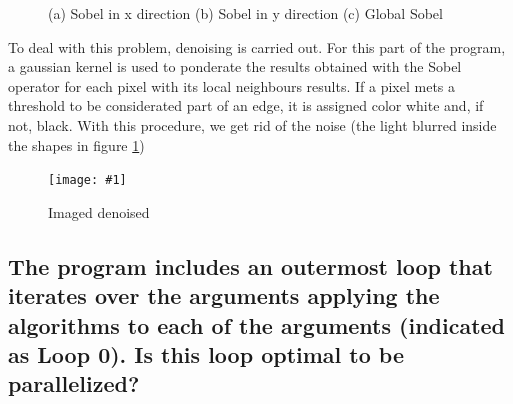 \documentclass{article}
\newcommand{\myFigure}[4]{%
    \begin{figure}[!ht]
        \texttt{[image: \#1]}
        \centering
        \caption{#2}
        \label{#3}
    \end{figure}
}
\newcommand{\question}[1]{\subsection{#1}}
\begin{document}
\begin{figure}[h!]
    \centering
    \caption{(a) Sobel in x direction (b) Sobel in y direction (c) Global Sobel}
    \label{sobel}
\end{figure}


To deal with this problem, denoising is carried out. For this part of the program, a gaussian kernel is used to ponderate the results obtained with the Sobel operator for each pixel with its local neighbours results. If a pixel mets a threshold to be considerated part of an edge, it is assigned color white and, if not, black. With this procedure, we get rid of the noise (the light blurred inside the shapes in figure \ref{sobel}) 

\myFigure{../material/img/im4_grad_denoised}{Imaged denoised}{denoised}{0.35}


\newpage
\question{The program includes an outermost loop that iterates over the arguments applying the algorithms to each of the arguments (indicated as Loop 0). Is this loop optimal to be parallelized?}
\end{document}

